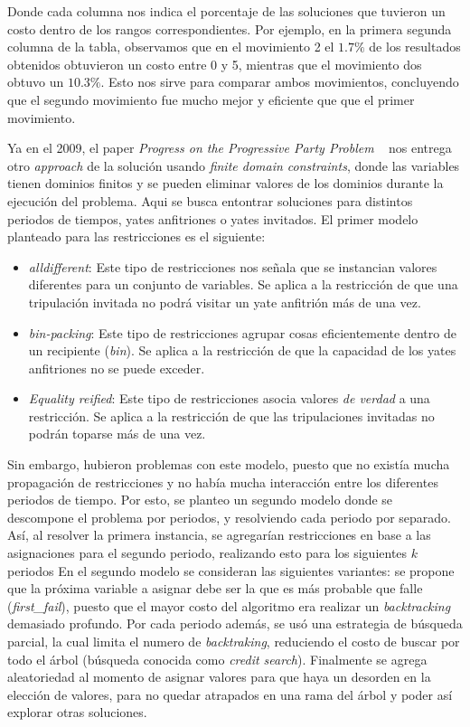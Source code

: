 \documentclass[letter, 10pt]{article}
\begin{document}
Donde cada columna nos indica el porcentaje de las soluciones que tuvieron un costo dentro de los rangos correspondientes. Por ejemplo, en la primera segunda columna de la tabla, observamos que en el movimiento 2 el $1.7\%$ de los resultados obtenidos obtuvieron un costo entre 0 y 5, mientras que el movimiento dos obtuvo un $10.3\%$. Esto nos sirve para comparar ambos movimientos, concluyendo que el segundo movimiento fue mucho mejor y eficiente que que el primer movimiento.

Ya en el 2009, el paper \textit{Progress on the Progressive Party Problem} ~\cite{Simonis2009} nos entrega otro \textit{approach} de la solución usando \textit{finite domain constraints}, donde las variables tienen dominios finitos y se pueden eliminar
valores de los dominios durante la ejecución del problema. Aqui se busca entontrar soluciones para distintos periodos de tiempos, yates anfitriones o yates invitados. El primer modelo planteado para las restricciones es el siguiente:

\begin{itemize}
    \item \textit{alldifferent}: Este tipo de restricciones nos señala que se instancian valores diferentes para un conjunto de variables. Se aplica a la restricción de que una tripulación invitada no podrá visitar un yate anfitrión más de una vez.
    \item \textit{bin-packing}: Este tipo de restricciones agrupar cosas eficientemente dentro de un recipiente (\textit{bin}). Se aplica a la restricción de que la capacidad de los yates anfitriones no se puede exceder.
    \item \textit{Equality reified}: Este tipo de restricciones asocia valores \textit{de verdad} a una restricción. Se aplica a la restricción de que las tripulaciones invitadas no podrán toparse más de una vez.
\end{itemize}
Sin embargo, hubieron problemas con este modelo, puesto que no existía mucha propagación de restricciones y no había mucha interacción entre los diferentes periodos de tiempo. Por esto, se planteo un segundo modelo donde se descompone el problema por periodos, y resolviendo cada periodo por separado. Así, al resolver la primera instancia, se agregarían restricciones en base a las asignaciones para el segundo periodo, realizando esto para los siguientes $k$ periodos En el segundo modelo se consideran las siguientes variantes: se propone que la próxima variable a asignar debe ser la que es más probable que falle (\textit{first\_fail}), puesto que el mayor costo del algoritmo era realizar un \textit{backtracking} demasiado profundo. Por cada periodo además, se usó una estrategia de búsqueda parcial, la cual limita el numero de \textit{backtraking}, reduciendo el costo de buscar por todo el árbol (búsqueda conocida como \textit{credit search}). Finalmente se agrega aleatoriedad al momento de asignar valores para que haya un desorden en la elección de valores, para no quedar atrapados en una rama del árbol y poder así explorar otras soluciones.
\end{document}
